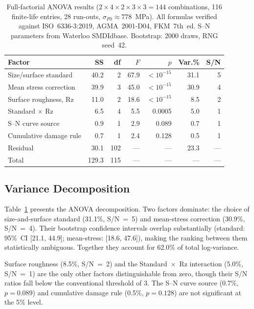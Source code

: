 \documentclass[12pt,a4paper]{article}
\begin{document}
\begin{table}[h]
\centering
\caption{Full-factorial ANOVA results ($2\times4\times2\times3\times3 =
144$ combinations, 116 finite-life entries, 28 run-outs,
$\sigma_{F0}\approx778$~MPa). All formulas verified against
ISO~6336-3:2019, AGMA~2001-D04, FKM~7th~ed. S--N parameters from
Waterloo SMDIdbase. Bootstrap: 2000 draws, RNG seed~42.}
\label{tab:anova}
\begin{tabular}{lrrrrrr}
\toprule
Factor & SS & df & $F$ & $p$ & Var.\% & S/N \\
\midrule
Size/surface standard & 40.2 & 2 & 67.9 & $<10^{-15}$ & 31.1 & 5 \\
Mean stress correction & 39.9 & 3 & 45.0 & $<10^{-15}$ & 30.9 & 4 \\
Surface roughness, Rz & 11.0 & 2 & 18.6 & $<10^{-15}$ & 8.5 & 2 \\
Standard $\times$ Rz & 6.5 & 4 & 5.5 & 0.0005 & 5.0 & 1 \\
S--N curve source & 0.9 & 1 & 2.9 & 0.089 & 0.7 & 1 \\
Cumulative damage rule & 0.7 & 1 & 2.4 & 0.128 & 0.5 & 1 \\
\midrule
Residual & 30.1 & 102 & --- & --- & 23.3 & --- \\
Total & 129.3 & 115 & --- & --- & --- & --- \\
\bottomrule
\end{tabular}
\end{table}

\subsection{Variance Decomposition}

Table~\ref{tab:anova} presents the ANOVA decomposition. Two factors
dominate: the choice of size-and-surface standard (31.1\%, S/N~=~5)
and mean-stress correction (30.9\%, S/N~=~4). Their bootstrap
confidence intervals overlap substantially (standard: 95\%~CI
[21.1, 44.9]; mean-stress: [18.6, 47.6]), making the ranking between
them statistically ambiguous. Together they account for 62.0\% of
total log-variance.

Surface roughness (8.5\%, S/N~=~2) and the Standard~$\times$~Rz
interaction (5.0\%, S/N~=~1) are the only other factors distinguishable
from zero, though their S/N ratios fall below the conventional
threshold of 3. The S--N curve source (0.7\%, $p=0.089$) and cumulative
damage rule (0.5\%, $p=0.128$) are not significant at the 5\% level.
\end{document}
